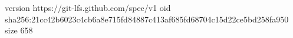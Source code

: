 version https://git-lfs.github.com/spec/v1
oid sha256:21cc42b6023c4cb6a8e715fd84887c413af685fd68704c15d22ce5bd258fa950
size 658
